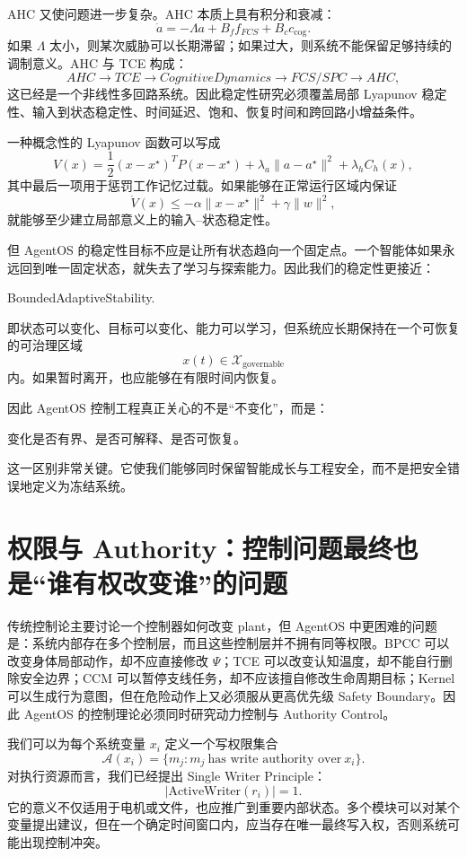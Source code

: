 AHC 又使问题进一步复杂。AHC 本质上具有积分和衰减：
\[
\dot a
=
-\Lambda a
+
B_f f_{FCS}
+
B_c c_{\mathrm{cog}}.
\]
如果 $\Lambda$ 太小，则某次威胁可以长期滞留；如果过大，则系统不能保留足够持续的调制意义。AHC 与 TCE 构成：
\[
AHC
\rightarrow
TCE
\rightarrow
CognitiveDynamics
\rightarrow
FCS/SPC
\rightarrow
AHC,
\]
这已经是一个非线性多回路系统。因此稳定性研究必须覆盖局部 Lyapunov 稳定性、输入到状态稳定性、时间延迟、饱和、恢复时间和跨回路小增益条件。

一种概念性的 Lyapunov 函数可以写成
\[
V(x)
=
\frac{1}{2}
(x-x^\star)^T
P
(x-x^\star)
+
\lambda_a
\|a-a^\star\|^2
+
\lambda_h
C_h(x),
\]
其中最后一项用于惩罚工作记忆过载。如果能够在正常运行区域内保证
\[
\dot V(x)\leq -\alpha\|x-x^\star\|^2+\gamma\|w\|^2,
\]
就能够至少建立局部意义上的输入--状态稳定性。

但 AgentOS 的稳定性目标不应是让所有状态趋向一个固定点。一个智能体如果永远回到唯一固定状态，就失去了学习与探索能力。因此我们的稳定性更接近：
\begin{statementbox}
BoundedAdaptiveStability.
\end{statementbox}
即状态可以变化、目标可以变化、能力可以学习，但系统应长期保持在一个可恢复的可治理区域
\[
x(t)\in\mathcal X_{\mathrm{governable}}
\]
内。如果暂时离开，也应能够在有限时间内恢复。

因此 AgentOS 控制工程真正关心的不是``不变化''，而是：
\begin{statementbox}
变化是否有界、是否可解释、是否可恢复。
\end{statementbox}
这一区别非常关键。它使我们能够同时保留智能成长与工程安全，而不是把安全错误地定义为冻结系统。

\section{权限与 Authority：控制问题最终也是“谁有权改变谁”的问题}

传统控制论主要讨论一个控制器如何改变 plant，但 AgentOS 中更困难的问题是：系统内部存在多个控制层，而且这些控制层并不拥有同等权限。BPCC 可以改变身体局部动作，却不应直接修改 $\Psi$；TCE 可以改变认知温度，却不能自行删除安全边界；CCM 可以暂停支线任务，却不应该擅自修改生命周期目标；Kernel 可以生成行为意图，但在危险动作上又必须服从更高优先级 Safety Boundary。因此 AgentOS 的控制理论必须同时研究动力控制与 Authority Control。

我们可以为每个系统变量 $x_i$ 定义一个写权限集合
\[
\mathcal A(x_i)
=
\{
m_j:
m_j\ \text{has write authority over}\ x_i
\}.
\]
对执行资源而言，我们已经提出 Single Writer Principle：
\[
\boxed{
|\mathrm{ActiveWriter}(r_i)|=1.
}
\]
它的意义不仅适用于电机或文件，也应推广到重要内部状态。多个模块可以对某个变量提出建议，但在一个确定时间窗口内，应当存在唯一最终写入权，否则系统可能出现控制冲突。

